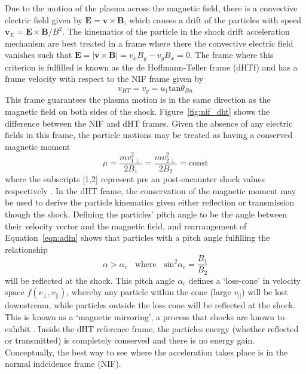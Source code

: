 Due to the motion of the plasma across the magnetic field, there is a convective electric field given by $\mathbf{E} = \mathbf{v}\times \mathbf{B}$, which causes a drift of the particles with speed $\mathbf{v}_E = \mathbf{E}\times \mathbf{B}/B^2$. The kinematics of the particle in the shock drift acceleration mechanism are best treated in a frame where there the convective electric field vanishes such that $\mathbf{E} = |\mathbf{v}\times \mathbf{B}|=v_x B_y - v_yB_x = 0$. The frame where this criterion is fulfilled is known as the de Hoffmann-Teller frame (dHTf) \citep{dehoffmann1950} and has a frame velocity with respect to the NIF frame given by
\begin{equation}
v_{HT} = v_y = u_1\mathrm{tan}\theta_{Bn}
\end{equation}
This frame guarantees the plasma motion is in the same direction as the magnetic field on both sides of the shock. Figure~\ref{fig:nif_dht} shows the difference between the NIF and dHT frames. Given the absence of any electric fields in this frame, the particle motions may be treated as having a conserved magnetic moment
\begin{equation}
\mu = \frac{mv^2_{1\perp}}{2B_1} = \frac{mv^2_{2\perp}}{2B_2} = \mathrm{const}
\label{eqn:adin}
\end{equation}
where the subscripts [1,2] represent pre an post-encounter shock values respectively \citep{ball2001}. In the dHT frame, the conservation of the magnetic moment may be used to derive the particle kinematics given either reflection or transmission though the shock. Defining the particles' pitch angle to be the angle between their velocity vector and the magnetic field, and rearrangement of Equation~\ref{eqn:adin} shows that particles with a pitch angle fulfilling the relationship
\begin{equation}
\alpha > \alpha_c~~~~\mathrm{where}~~~~\mathrm{sin}^2\alpha_c = \frac{B_1}{B_2}
\end{equation}
will be reflected at the shock. This pitch angle $\alpha_c$ defines a `loss-cone' in velocity space $f(v_{\perp}, v_{||})$, whereby any particle within the cone (large $v_{||}$) will be lost downstream, while particles outside the loss cone will be reflected at the shock. This is known as a `magnetic mirroring', a process that shocks are known to exhibit \citep{feldman1983}. Inside the dHT reference frame, the particles energy (whether reflected or transmitted) is completely conserved and there is no energy gain. Conceptually, the best way to see where the acceleration takes place is in the normal indcidence frame (NIF).
